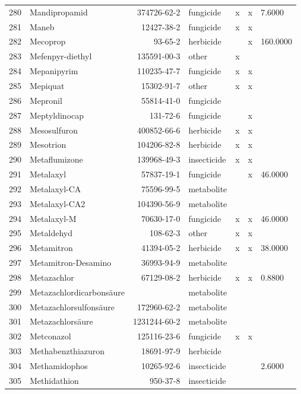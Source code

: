 \begin{longtable}{lp{4cm}rlp{1.3cm}p{1.3cm}p{1.5cm}}
  280 & Mandipropamid & 374726-62-2 & fungicide & x & x & 7.6000 \\ 
  281 & Maneb & 12427-38-2 & fungicide & x & x &  \\ 
  282 & Mecoprop & 93-65-2 & herbicide &  & x & 160.0000 \\ 
  283 & Mefenpyr-diethyl & 135591-00-3 & other & x &  &  \\ 
  284 & Mepanipyrim & 110235-47-7 & fungicide & x & x &  \\ 
  285 & Mepiquat & 15302-91-7 & other & x & x &  \\ 
  286 & Mepronil & 55814-41-0 & fungicide &  &  &  \\ 
  287 & Meptyldinocap & 131-72-6 & fungicide &  & x &  \\ 
  288 & Mesosulfuron & 400852-66-6 & herbicide & x & x &  \\ 
  289 & Mesotrion & 104206-82-8 & herbicide & x & x &  \\ 
  290 & Metaflumizone & 139968-49-3 & insecticide & x & x &  \\ 
  291 & Metalaxyl & 57837-19-1 & fungicide &  & x & 46.0000 \\ 
  292 & Metalaxyl-CA & 75596-99-5 & metabolite &  &  &  \\ 
  293 & Metalaxyl-CA2 & 104390-56-9 & metabolite &  &  &  \\ 
  294 & Metalaxyl-M & 70630-17-0 & fungicide & x & x & 46.0000 \\ 
  295 & Metaldehyd & 108-62-3 & other & x & x &  \\ 
  296 & Metamitron & 41394-05-2 & herbicide & x & x & 38.0000 \\ 
  297 & Metamitron-Desamino & 36993-94-9 & metabolite &  &  &  \\ 
  298 & Metazachlor & 67129-08-2 & herbicide & x & x & 0.8800 \\ 
  299 & Metazachlordicarbonsäure &  & metabolite &  &  &  \\ 
  300 & Metazachlorsulfonsäure & 172960-62-2 & metabolite &  &  &  \\ 
  301 & Metazachlorsäure & 1231244-60-2 & metabolite &  &  &  \\ 
  302 & Metconazol & 125116-23-6 & fungicide & x & x &  \\ 
  303 & Methabenzthiazuron & 18691-97-9 & herbicide &  &  &  \\ 
  304 & Methamidophos & 10265-92-6 & insecticide &  &  & 2.6000 \\ 
  305 & Methidathion & 950-37-8 & insecticide &  &  &  \\ 

\end{longtable}
